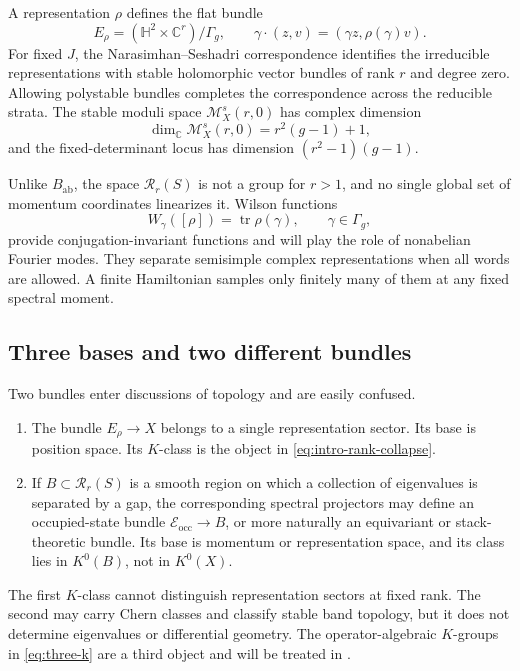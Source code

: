 \documentclass[11pt]{article}
\theoremstyle{definition}
\theoremstyle{remark}
\newcommand{\HH}{\mathbb H}
\newcommand{\CC}{\mathbb C}
\newcommand{\tr}{\operatorname{tr}}
\newcommand{\cR}{\mathcal R}
\newcommand{\cM}{\mathcal M}
\begin{document}
A representation \(\rho\) defines the flat bundle
\[
 E_\rho=(\HH^2\times\CC^r)/\Gamma_g,
 \qquad
 \gamma\cdot(z,v)=(\gamma z,\rho(\gamma)v).
 \tag{2.7}\label{eq:flat-vector}
\]
For fixed \(J\), the Narasimhan--Seshadri correspondence identifies the
irreducible representations with stable holomorphic vector bundles of rank
\(r\) and degree zero.  Allowing polystable bundles completes the
correspondence across the reducible strata.  The stable moduli space
\(\cM_X^s(r,0)\) has complex dimension
\[
       \dim_\CC\cM_X^s(r,0)=r^2(g-1)+1,
       \tag{2.8}\label{eq:moduli-dim}
\]
and the fixed-determinant locus has dimension
\((r^2-1)(g-1)\).

Unlike \(B_{\mathrm{ab}}\), the space \(\cR_r(S)\) is not a group for
\(r>1\), and no single global set of momentum coordinates linearizes it.
Wilson functions
\[
          W_\gamma([\rho])=\tr\rho(\gamma),
          \qquad \gamma\in\Gamma_g,
          \tag{2.9}\label{eq:wilson-functions}
\]
provide conjugation-invariant functions and will play the role of
nonabelian Fourier modes.  They separate semisimple complex representations
when all words are allowed.  A finite Hamiltonian samples only finitely many
of them at any fixed spectral moment.

\subsection{Three bases and two different bundles}

Two bundles enter discussions of topology and are easily confused.

\begin{enumerate}[label=\textup{(\alph*)},leftmargin=2.5em]
\item The bundle \(E_\rho\to X\) belongs to a single representation sector.
  Its base is position space.  Its \(K\)-class is the object in
  \eqref{eq:intro-rank-collapse}.

\item If \(B\subset\cR_r(S)\) is a smooth region on which a collection of
  eigenvalues is separated by a gap, the corresponding spectral projectors
  may define an occupied-state bundle \(\mathscr E_{\mathrm{occ}}\to B\), or
  more naturally an equivariant or stack-theoretic bundle.  Its base is
  momentum or representation space, and its class lies in \(K^0(B)\), not in
  \(K^0(X)\).
\end{enumerate}

The first \(K\)-class cannot distinguish representation sectors at fixed
rank.  The second may carry Chern classes and classify stable band topology,
but it does not determine eigenvalues or differential geometry.  The
operator-algebraic \(K\)-groups in \eqref{eq:three-k} are a third object and
will be treated in .
\end{document}
